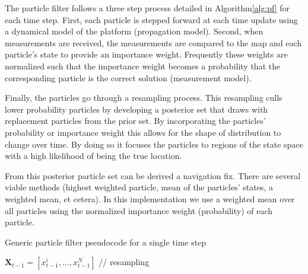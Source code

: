 \documentclass[]{article}
\begin{document}
The particle filter follows a three step process detailed in Algorithm\ref{alg:pf} for each time step. First, each particle is stepped forward at each time update using a dynamical model of the platform (propagation model). Second, when measurements are received, the measurements are compared to the map and each particle's state to provide an importance weight. Frequently these weights are normalized such that the importance weight becomes a probability that the corresponding particle is the correct solution (measurement model). 

Finally, the particles go through a resampling process. This resampling culls lower probability particles by developing a posterior set that draws with replacement particles from the prior set. By incorporating the particles' probability or importance weight this allows for the shape of distribution to change over time. By doing so it focuses the particles to regions of the state space with a high likelihood of being the true location.

From this posterior particle set can be derived a navigation fix. There are several viable methods (highest weighted particle, mean of the particles' states, a weighted mean, et cetera). In this implementation we use a weighted mean over all particles using the normalized importance weight (probability) of each particle.

\begin{algorithm}
	\caption{Generic particle filter pseudocode for a single time step}\label{alg:pf}
	\begin{algorithmic}[1]
		\State$\textbf{X}_{t-1}=\left[x^i_{t-1}, \ldots, x^N_{t-1}\right]$
		\EndFor{}
		 \qquad{}\qquad{}\qquad{}\quad{}\enspace{} // resampling
		\EndFor{}
	\end{algorithmic}
\end{algorithm}



\end{document}
